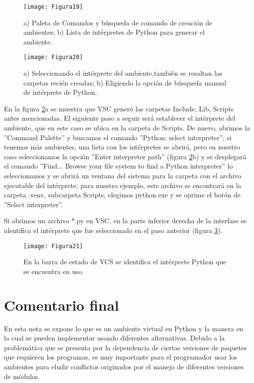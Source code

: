 \begin{figure}[H]
\centering
\texttt{[image: Figura19]}
\caption{a) Paleta de Comandos y búsqueda de comando de creación de ambientes; b) Lista de intérpretes de Python para generar el ambiente.}
\label{fig:figura19}
\end{figure}
	
\begin{figure}[H]
\centering
\texttt{[image: Figura20]}
\caption{a) Seleccionando el intérprete del ambiente,también se resaltan las carpetas recién creadas; b) Eligiendo la opción de búsqueda manual de intérprete de Python.}
\label{fig:figura20}
\end{figure}
	
En la figura \ref{fig:figura20}a se muestra que VSC generó las carpetas Include, Lib, Scripts antes mencionadas. El siguiente paso a seguir será establecer el intérprete del ambiente, que en este caso se ubica en la carpeta de Scripts. De nuevo, abrimos la ''Command Palette'' y buscamos el comando ''Python: select interpreter''; si tenemos más ambientes, una lista con los intérpretes se abrirá, pero en nuestro caso seleccionamos la opción ''Enter interpreter path'' (figura \ref{fig:figura20}b) y se desplegará el comando ''Find... Browse your file system to find a Python interpreter'' lo seleccionamos y se abrirá un ventana del sistema para la carpeta con el archivo ejecutable del intérprete; para nuestro ejemplo, este archivo se encontrará en la carpeta .venv, subcarpeta Scripts, elegimos python.exe y se oprime el botón de ''Select interpreter''. \bigskip  
	
Si abrimos un archivo *.py en VSC, en la parte inferior derecha de la interfase se identifica el intérprete que fue seleccionado en el paso anterior (figura \ref{fig:figura21}).
	
\begin{figure}[H]
\centering
\texttt{[image: Figura21]}
\caption{En la barra de estado de VCS se identifica el intérprete Python que se encuentra en uso.}
\label{fig:figura21}
\end{figure}
	
\section{Comentario final}
En esta nota se expone lo que es un ambiente virtual en Python y la manera en la cual se pueden implementar usando diferentes alternativas. Debido a la problemática que se presenta por la dependencia de ciertas versiones de paquetes que requieren los programas, es muy importante para el programador usar los ambientes para eludir conflictos originados por el manejo de diferentes versiones de módulos.\bigskip  
	
